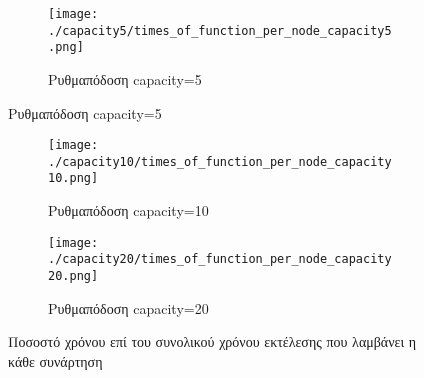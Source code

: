 \documentclass{article}
\newcommand{\eng}[1]{\foreignlanguage{english}{#1}} %
\begin{document}
\begin{figure}[ht]
    \centering
    \begin{subfigure}{\textwidth}
        \texttt{[image: ./capacity5/times\_of\_function\_per\_node\_capacity5.png]}
        \caption{Ρυθμαπόδοση \eng{capacity=5}}
    \end{subfigure}
\end{figure}
\begin{figure}[ht]
    \ContinuedFloat
    \begin{subfigure}{\textwidth}
        \texttt{[image: ./capacity10/times\_of\_function\_per\_node\_capacity10.png]}
        \caption{Ρυθμαπόδοση \eng{capacity=10}}
    \end{subfigure}
    \begin{subfigure}{\textwidth}
        \texttt{[image: ./capacity20/times\_of\_function\_per\_node\_capacity20.png]}
        \caption{Ρυθμαπόδοση \eng{capacity=20}}
    \end{subfigure}
    \caption{Ποσοστό χρόνου επί του συνολικού χρόνου εκτέλεσης που λαμβάνει η κάθε συνάρτηση}
\end{figure}
\FloatBarrier


\begin{table}[ht]
    \caption{Στατιστικά συναρτήσεων ανά κόμβο} 
    \label{tab:throughput-funcs}
    \begin{subtable}{\textwidth}
        \centering
        \caption{\eng{capacity=5}}
        \label{tab:throughput-funcs-1}
    \end{subtable}
\end{table}

\begin{table}[ht]
    \ContinuedFloat
    \begin{subtable}{0.45\textwidth}
        \centering
        \caption{\eng{capacity=10}}
        \label{tab:throughput-funcs-2}
    \end{subtable}
    \hfill
    \begin{subtable}{0.45\textwidth}
        \centering
        \caption{\eng{capacity=20}}
        \label{tab:throughput-funcs-3}
    \end{subtable}
\end{table}
\FloatBarrier
\end{document}
